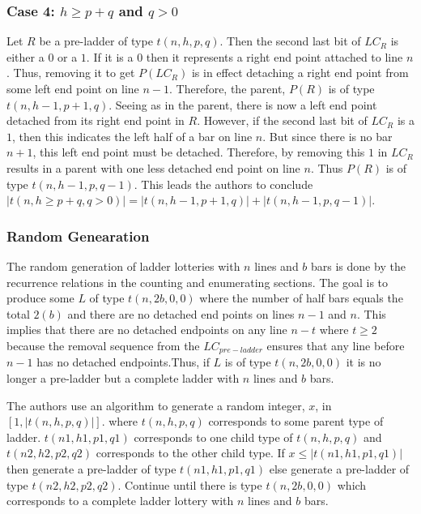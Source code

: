 \subsubsection{Case 4: $h\geq p+q$ and $q>0$}
Let $R$ be a pre-ladder of type $t(n,h,p,q)$. Then 
the second last bit of $LC_{R}$ is either a $0$ 
or a $1$. If it is a $0$ then it represents a 
right end point attached to line $n$. Thus, 
removing it to get $P(LC_{R})$ is in effect 
detaching a right end point from some left end point 
on line $n-1$. Therefore, the parent, $P(R)$ is 
of type $t(n,h-1,p+1,q)$. Seeing as in the parent, 
there is now a left end point detached from its right 
end point in $R$. However, if the second last bit 
of $LC_{R}$ is a $1$, then this indicates the left 
half of a bar on line $n$. But since there is no 
bar $n+1$, this left end point must be detached. 
Therefore, by removing this $1$ in $LC_{R}$ results 
in a parent with one less detached end point on line $n$.
Thus $P(R)$ is of type $t(n,h-1,p,q-1)$. This leads the 
authors to conclude $|t(n,h\geq p+q,q>0)|=|t(n,h-1,p+1,q)|+|t(n,h-1,p,q-1)|$.
\subsubsection{Random Genearation}
The random generation of ladder lotteries with $n$ lines and
$b$ bars is done by the recurrence relations in the counting 
and enumerating sections. The goal is to produce 
some $L$ of type $t(n,2b,0,0)$ where the number of half 
bars equals the total $2(b)$ and there are no detached 
end points on lines $n-1$ and $n$. This implies that there 
are no detached endpoints on any line $n-t$ where $t\geq2$
because the removal sequence from the $LC_{pre-ladder}$
ensures that any line before $n-1$ has no detached endpoints.Thus, 
if $L$ is of type $t(n,2b,0,0)$ it is no longer a pre-ladder 
but a complete ladder with $n$ lines and $b$ bars.\par 
The authors use an algorithm to generate a random integer, $x$,
in $[1,|t(n,h,p,q)|]$. where $t(n,h,p,q)$ corresponds to some 
parent type of ladder. $t(n1,h1,p1,q1)$ corresponds to one 
child type of $t(n,h,p,q)$ and $t(n2,h2,p2,q2)$ corresponds 
to the other child type. If $x\leq|t(n1,h1,p1,q1)|$ then generate 
a pre-ladder of type $t(n1,h1,p1,q1)$ else generate a pre-ladder 
of type $t(n2,h2,p2,q2)$. Continue until there is type $t(n,2b,0,0)$
which corresponds to a complete ladder lottery with $n$ lines and $b$ bars.
